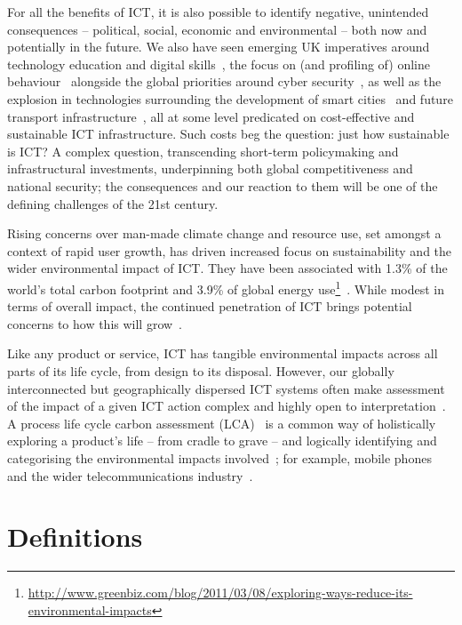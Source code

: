 \documentclass[conference]{IEEEtran}
\begin{document}
For all the benefits of ICT, it is also possible to identify negative,
unintended consequences -- political, social, economic and
environmental -- both now and potentially in the future. We also have
seen emerging UK imperatives around technology education and digital
skills~\cite{brown-et-al-toce2014}, the focus on (and profiling of)
online behaviour~\cite{oatley+crick:2014} alongside the global
priorities around cyber security~\cite{carr+crick-csss2015}, as well
as the explosion in technologies surrounding the development of smart
cities~\cite{cosgrave-et-al:2014} and future transport
infrastructure~\cite{cooper-et-al-sose}, all at some level predicated
on cost-effective and sustainable ICT infrastructure. Such costs beg
the question: just how sustainable is ICT? A complex question,
transcending short-term policymaking and infrastructural investments,
underpinning both global competitiveness and national security; the
consequences and our reaction to them will be one of the defining
challenges of the 21st century.

Rising concerns over man-made climate change and resource use, set
amongst a context of rapid user growth, has driven increased focus on
sustainability and the wider environmental impact of ICT. They have
been associated with 1.3\% of the world's total carbon footprint and
3.9\% of global energy
use\footnote{\url{http://www.greenbiz.com/blog/2011/03/08/exploring-ways-reduce-its-environmental-impacts}}~\cite{plepys:2002}. While
modest in terms of overall impact, the continued penetration of ICT
brings potential concerns to how this will grow~\cite{yi+thomas:2007}.

Like any product or service, ICT has tangible environmental impacts
across all parts of its life cycle, from design to its
disposal. However, our globally interconnected but geographically
dispersed ICT systems often make assessment of the impact of a given
ICT action complex and highly open to
interpretation~\cite{andrae+andersen:2010}. A process life cycle
carbon assessment
(LCA)~\cite{baumann+tillman:2004,iso14040:2006,bsi2050:2011} is a
common way of holistically exploring a product's life -- from cradle
to grave -- and logically identifying and categorising the
environmental impacts involved~\cite{malmodin-et-al:2014}; for
example, mobile phones~\cite{frey-et-al:2008,fehske:2011} and the
wider telecommunications industry~\cite{scharnhorst:2008}.

\section{Definitions}
\end{document}

